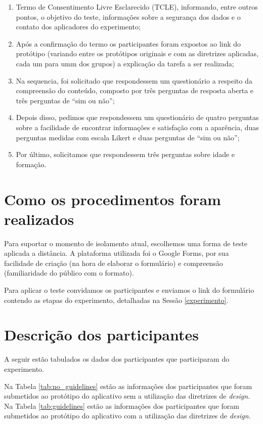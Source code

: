 \documentclass[12pt]{article}
\begin{document}
\begin{enumerate}
\item Termo de Consentimento Livre Esclarecido (TCLE), informando, entre outros pontos, o objetivo do teste, informações sobre a segurança dos dados e o contato dos aplicadores do experimento;
\item Após a confirmação do termo os participantes foram expostos ao link do protótipo (variando entre os protótipos originais e com as diretrizes aplicadas, cada um para umm dos grupos) a explicação da tarefa a ser realizada;
\item Na sequencia, foi solicitado que respondessem um questionário a respeito da compreensão do conteúdo, composto por três perguntas de resposta aberta e três perguntas de ``sim ou não'';
\item Depois disso, pedimos que respondessem um questionário de quatro perguntas sobre a facilidade de encontrar informações e satisfação com a aparência, duas perguntas medidas com escala Likert e duas perguntas de ``sim ou não'';
\item Por último, solicitamos que respondessem três perguntas sobre idade e formação.
\end{enumerate}

\section{Como os procedimentos foram realizados}

Para suportar o momento de isolamento atual, escolhemos uma forma de teste aplicada a distância. A plataforma utilizada foi o Google Forms, por sua facilidade de criação (na hora de elaborar o formulário) e compreensão (familiaridade do público com o formato).

Para aplicar o teste convidamos os participantes e enviamos o link do formulário contendo as etapas do experimento, detalhadas na Sessão \ref{experimento}.

\section{Descrição dos participantes}

A seguir estão tabulados os dados dos participantes que participaram do experimento.

Na Tabela \ref{tab:no_guidelines} estão as informações dos participantes que foram submetidos ao protótipo do aplicativo sem a utilização das diretrizes de \textit{design}. Na Tabela \ref{tab:guidelines} estão as informações dos participantes que foram submetidos ao protótipo do aplicativo com a utilização das diretrizes de \textit{design}.
\end{document}
